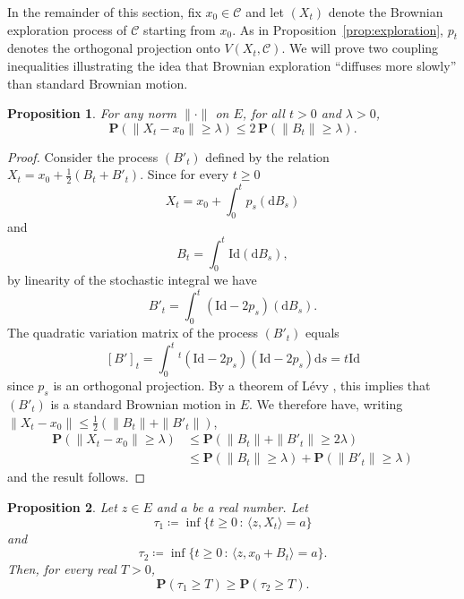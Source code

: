 \documentclass[12pt]{amsart}
\renewcommand{\P}{\mathbf{P}}
\newcommand{\scalar}[2]{\langle #1 , #2\rangle}
\renewcommand{\leq}{\leqslant}
\renewcommand{\geq}{\geqslant}
\theoremstyle{plain}
\newtheorem{proposition}{Proposition}
\theoremstyle{remark}
\begin{document}
 
In the remainder of this section, fix $x_0 \in \mathscr{C}$ and let $(X_t)$ denote the Brownian exploration process of $\mathscr{C}$ starting from $x_0$. As in Proposition~\ref{prop:exploration}, $p_t$ denotes the orthogonal projection onto $V(X_t,\mathscr{C})$. We will prove two coupling inequalities illustrating the idea that Brownian exploration ``diffuses more slowly'' than standard Brownian motion.
 
\begin{proposition} \label{prop:maurey}
For any norm $\|\cdot\|$ on $E$, for all $t>0$ and $\lambda > 0$,
\[ \P ( \| X_t-x_0\| \geq \lambda) \leq 2 \, \P ( \|B_t\| \geq \lambda). \]
\end{proposition}
 
\begin{proof}
Consider the process $(B'_t)$ defined by the relation $X_t = x_0 + \frac{1}{2}\left( B_t + B'_t\right)$. Since for every $t \geq 0$
\[ X_t = x_0 + \int_0^t p_s(\mathrm{d}B_s)\]
and
\[ B_t = \int_0^t \mathrm{Id}(\mathrm{d}B_s),\]
by linearity of the stochastic integral we have
\[ B'_t = \int_0^t (\mathrm{Id}-2p_s)(\mathrm{d}B_s).\]
The quadratic variation matrix of the process $(B'_t)$ equals
\[ [B']_t = \int_0^t {^t}(\mathrm{Id}-2p_s)(\mathrm{Id}-2p_s) \mathrm{d}s = t \mathrm{Id}\]
since $p_s$ is an orthogonal projection. By a theorem of L\'evy \cite[Theorem 5.4]{LeGall13}, this implies that $(B'_t)$ is a standard Brownian motion in $E$. We therefore have, writing $\|X_t-x_0\| \leq \frac{1}{2} (\|B_t\|+\|B'_t\|)$,
\begin{align*}
\P  (\| X_t-x_0\| \geq \lambda) & \leq \P  \left(\| B_t \| + \|B'_t\| \geq 2\lambda \right) \\
& \leq \P  ( \| B_t \| \geq \lambda) + \P  ( \| B'_t \| \geq \lambda)
\end{align*}
and the result follows.
\end{proof}
 
\begin{proposition} \label{prop:couplage}
Let $z \in  E$ and $a$ be a real number.
Let
\[ \tau_1 \coloneqq \inf \{ t \geq 0 \, : \, \scalar{z}{X_t} = a \} \]
and
\[ \tau_2 \coloneqq \inf \{ t \geq 0 \, : \, \scalar{z}{x_0+B_t} = a \}. \]
Then, for every real $T > 0$,
\[ \P(\tau_1 \geq T) \geq \P (\tau_2 \geq T) .\]
\end{proposition}
 
\end{document}
